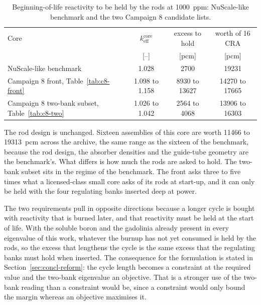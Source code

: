 \begin{table}[htbp]
  \centering
  \small
  \caption[Reactivity to be held by the rods, against the
  benchmark]{Beginning-of-life reactivity to be held by the rods at \SI{1000}{ppm}: NuScale-like benchmark and the two Campaign 8 candidate lists.}
  \label{tab:bench-compare}
  \begin{tabularx}{\textwidth}{@{}>{\raggedright\arraybackslash}X ccc@{}}
    \toprule
    Core & $k_\mathrm{eff}^\mathrm{core}$ & excess to hold &
      worth of 16 CRA \\
     & [--] & [pcm] & [pcm] \\
    \midrule
    NuScale-like benchmark~\cite{fridman_nuscale_benchmark_2023}
      & 1.028 & 2700 & 19231 \\
    Campaign 8 front, Table~\ref{tab:c8-front}
      & 1.098 to 1.158 & 8930 to 13627 & 14270 to 17665 \\
    Campaign 8 two-bank subset, Table~\ref{tab:c8-two}
      & 1.026 to 1.042 & 2564 to 4068 & 13906 to 16303 \\
    \bottomrule
  \end{tabularx}
\end{table}

The rod design is unchanged. Sixteen assemblies of this core are worth
\num{11466} to \SI{19313}{pcm} across the archive, the same range as
the sixteen of the benchmark, because the rod design, the absorber
densities and the guide-tube geometry are the benchmark's. What
differs is how much the rods are asked to hold. The two-bank subset
sits in the regime of the benchmark. The front asks three to five
times what a licensed-class small core asks of its rods at start-up,
and it can only be held with the four regulating banks inserted deep
at power.


The two requirements pull in opposite directions because a longer
cycle is bought with reactivity that is burned later, and that
reactivity must be held at the start of life. With the soluble boron
and the gadolinia already present in every eigenvalue of this work,
whatever the burnup has not yet consumed is held by the rods, so the
excess that lengthens the cycle is the same excess that the
regulating banks must hold when inserted. The consequence for the formulation is
stated in Section~\ref{sec:concl-reform}: the cycle length becomes a
constraint at the required value and the two-bank eigenvalue an
objective. That is a stronger use of the two-bank reading than a
constraint would be, since a constraint would only bound the margin
whereas an objective maximises it.


